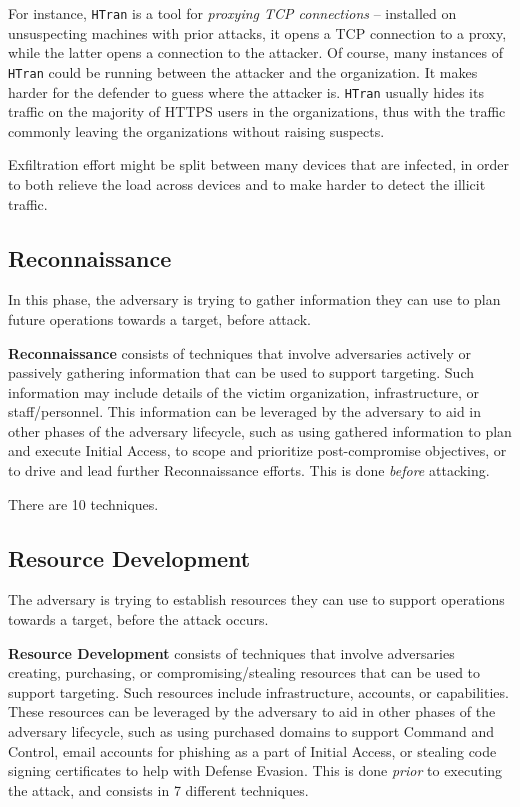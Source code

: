 \documentclass[10pt]{\classname}
\begin{document}
For instance, \texttt{HTran} is a tool for \emph{proxying TCP connections} --
installed on unsuspecting machines with prior attacks, it opens a TCP
connection to a proxy, while the latter opens a connection to the attacker. Of
course, many instances of \texttt{HTran} could be running between the attacker
and the organization. It makes harder for the defender to guess where the
attacker is. \texttt{HTran} usually hides its traffic on the majority of HTTPS
users in the organizations, thus with the traffic commonly leaving the
organizations without raising suspects. 

Exfiltration effort might be split between many devices that are
infected, in order to both relieve the load across devices and to make harder
to detect the illicit traffic.

\subsection{Reconnaissance}

In this phase, the adversary is trying to gather information they can use to
plan future operations towards a target, before attack.

\textbf{Reconnaissance} consists of techniques that involve adversaries
actively or passively gathering information that can be used to support
targeting. Such information may include details of the victim organization,
infrastructure, or staff/personnel. This information can be leveraged by the
adversary to aid in other phases of the adversary lifecycle, such as using
gathered information to plan and execute Initial Access, to scope and
prioritize post-compromise objectives, or to drive and lead further
Reconnaissance efforts. This is done \emph{before} attacking.

There are 10 techniques.

\subsection{Resource Development}

The adversary is trying to establish resources they can use to support
operations towards a target, before the attack occurs.

\textbf{Resource Development} consists of techniques that involve adversaries
creating, purchasing, or compromising/stealing resources that can be used to
support targeting. Such resources include infrastructure, accounts, or
capabilities. These resources can be leveraged by the adversary to aid in other
phases of the adversary lifecycle, such as using purchased domains to support
Command and Control, email accounts for phishing as a part of Initial Access,
or stealing code signing certificates to help with Defense Evasion. This is
done \emph{prior} to executing the attack, and consists in 7 different
techniques.
\end{document}
